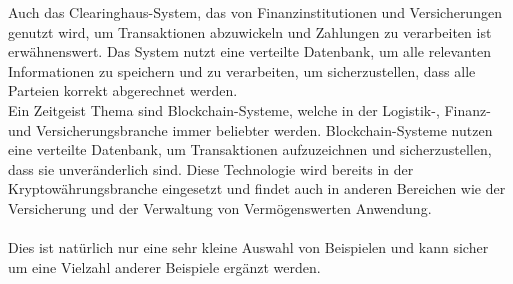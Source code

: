 Auch das Clearinghaus-System\cite{clearinghouse}, das von Finanzinstitutionen und Versicherungen genutzt wird, um Transaktionen abzuwickeln und Zahlungen zu verarbeiten ist erwähnenswert. Das System nutzt eine verteilte Datenbank, um alle relevanten Informationen zu speichern und zu verarbeiten, um sicherzustellen, dass alle Parteien korrekt abgerechnet werden.
\\
Ein Zeitgeist Thema sind Blockchain-Systeme\cite{blockchain}, welche in der Logistik-, Finanz- und Versicherungsbranche immer beliebter werden. Blockchain-Systeme nutzen eine verteilte Datenbank, um Transaktionen aufzuzeichnen und sicherzustellen, dass sie unveränderlich sind. Diese Technologie wird bereits in der Kryptowährungsbranche eingesetzt und findet auch in anderen Bereichen wie der Versicherung und der Verwaltung von Vermögenswerten Anwendung.
\\\\
Dies ist natürlich nur eine sehr kleine Auswahl von Beispielen und kann sicher um eine Vielzahl anderer Beispiele ergänzt werden. 